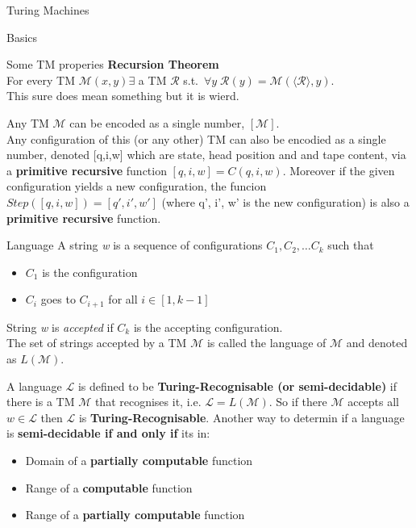 \documentclass[12pt, letterpaper]{article}
\begin{document}
\begin{section}{Turing Machines}
\begin{subsection}{Basics}
\begin{subsubsection}{Some TM properies}
      \textbf{Recursion Theorem} \\
      For every TM \(\mathscr{M}(x, y) \exists\) a TM \(\mathscr{R}\) s.t.\
      \(\forall y \; \mathscr{R}(y) = \mathscr{M}(\langle \mathscr{R} \rangle, y)\). \\
      This sure does mean something but it is wierd.

      Any TM \(\mathscr{M}\) can be encoded as a single number, \([\mathscr{M}]\). \\
      Any configuration of this (or any other) TM can also be encodied as a single number,
      denoted [q,i,w] which are state, head position and and tape content, via a
      \textbf{primitive recursive} function \([q, i, w] = C(q, i, w)\).
      Moreover if the given configuration yields a new configuration, the funcion
      \(Step([q, i, w]) = [q', i', w']\) (where q', i', w' is the new configuration)
      is also a \textbf{primitive recursive} function.
    \end{subsubsection}

  \end{subsection}

  \begin{subsection}{Language}
    A string \textit{w} is a sequence of configurations \(C_{1}, C_{2}, \dots C_{k}\) such that
    \begin{itemize}
      \item \(C_{1}\) is the configuration
      \item \(C_{i}\) goes to \(C_{i+1}\) for all \(i \in [1, k - 1]\)
    \end{itemize}
    String \textit{w} is \emph{accepted} if \(C_{k}\) is the accepting configuration. \\
    The set of strings accepted by a TM \(\mathscr{M}\) is called the language of \(\mathscr{M}\)
    and denoted as \(L(\mathscr{M})\).

    A language \(\mathscr{L}\) is defined to be \textbf{Turing-Recognisable (or semi-decidable)}
    if there is a TM \(\mathscr{M}\) that recognises it, i.e. \(\mathscr{L} = L(\mathscr{M})\).
    So if there \(\mathscr{M}\) accepts all \(\textit{w} \in \mathscr{L}\) then \(\mathscr{L}\)
    is \textbf{Turing-Recognisable}.
    Another way to determin if a language is \textbf{semi-decidable if and only if} its in:
    \begin{itemize}
      \item Domain of a \textbf{partially computable} function
      \item Range of a \textbf{computable} function
      \item Range of a \textbf{partially computable} function
    \end{itemize}


\end{subsection}
\end{section}
\end{document}
